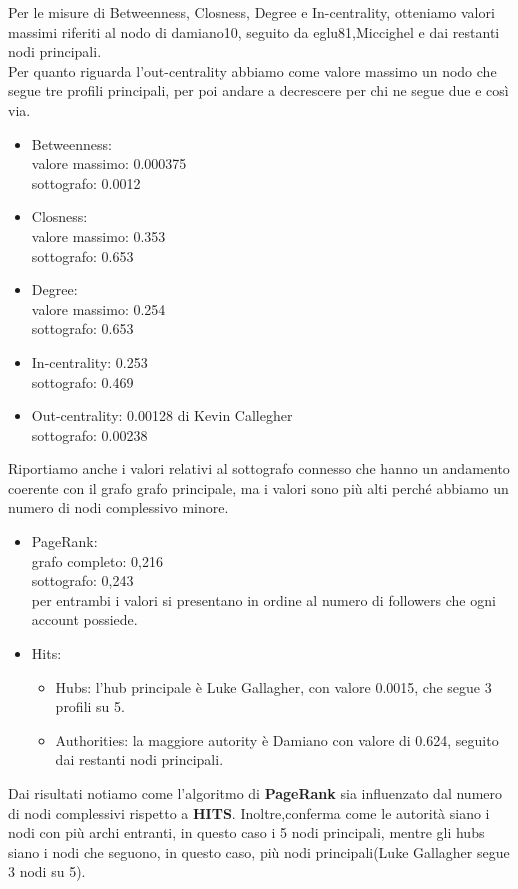 \documentclass[a4paper,11pt]{report}
\begin{document}
Per le misure di Betweenness, Closness, Degree e In-centrality, otteniamo  valori massimi riferiti al nodo di damiano10, seguito da eglu81,Miccighel e dai restanti nodi principali.\\Per quanto riguarda l'out-centrality abbiamo come valore massimo un nodo che segue tre profili principali, per poi andare a decrescere per chi ne segue due e così via.
		\begin{itemize}
			\item Betweenness:\\ valore massimo: 0.000375 \\sottografo: 0.0012 
			\item Closness: \\valore massimo: 0.353 
			\\sottografo: 0.653
			\item Degree: \\valore massimo: 0.254 
			\\sottografo: 0.653
			\item In-centrality: 0.253 \\sottografo: 0.469
			\item Out-centrality: 0.00128 di Kevin Callegher \\sottografo: 0.00238 
		\end{itemize}
	Riportiamo anche i valori relativi al sottografo connesso che hanno un andamento coerente con il grafo grafo principale, ma i valori sono più alti perché abbiamo un numero di nodi complessivo minore.
		\begin{itemize}
			\item PageRank:\\ grafo completo: 0,216\\  
			sottografo: 0,243 \\per entrambi i valori si presentano in ordine al numero di followers che ogni account possiede.
			\item Hits: 
				\begin{itemize}
					\item Hubs: l'hub principale è Luke Gallagher, con valore 0.0015, che segue 3 profili su 5.
					\item Authorities: la maggiore autority è Damiano con valore di 0.624, seguito dai restanti nodi principali.
			\end{itemize}
		\end{itemize}
	Dai risultati notiamo come l'algoritmo di \textbf{PageRank} sia influenzato dal numero di nodi complessivi rispetto a \textbf{HITS}. Inoltre,conferma come le autorità siano i nodi con più archi entranti, in questo caso i 5 nodi principali, mentre gli hubs siano i nodi che seguono, in questo caso, più nodi principali(Luke Gallagher segue 3 nodi su 5).
\end{document}
